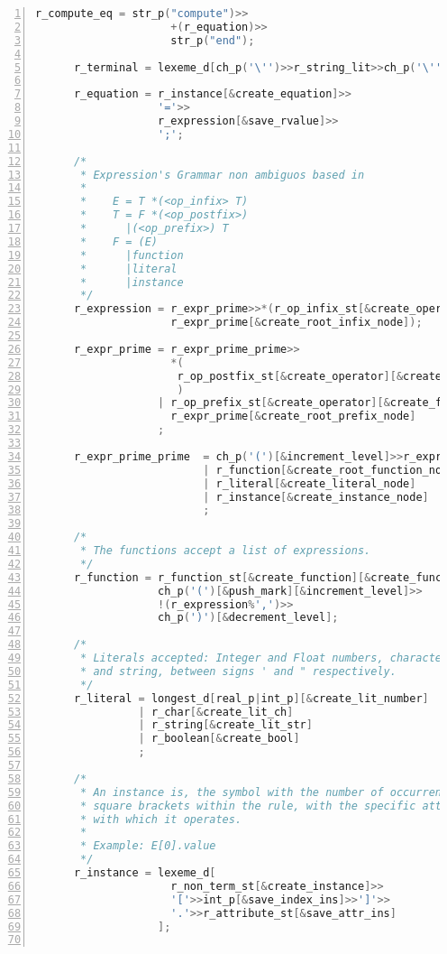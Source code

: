 \begin{center}
\begin{lstlisting}[numbers=left,basicstyle=\tiny,language=C++]
      r_compute_eq = str_p("compute")>>
                     +(r_equation)>>
                     str_p("end");

      r_terminal = lexeme_d[ch_p('\'')>>r_string_lit>>ch_p('\'')];

      r_equation = r_instance[&create_equation]>>
                   '='>>
                   r_expression[&save_rvalue]>>
                   ';';

      /*
       * Expression's Grammar non ambiguos based in
       *
       *    E = T *(<op_infix> T)
       *    T = F *(<op_postfix>)
       *      |(<op_prefix>) T
       *    F = (E)
       *      |function
       *      |literal
       *      |instance
       */
      r_expression = r_expr_prime>>*(r_op_infix_st[&create_operator][&create_func_node]>>
                     r_expr_prime[&create_root_infix_node]);

      r_expr_prime = r_expr_prime_prime>>
                     *(
                      r_op_postfix_st[&create_operator][&create_func_node][&create_root_postfix_node]
                      )
                   | r_op_prefix_st[&create_operator][&create_func_node]>>
                     r_expr_prime[&create_root_prefix_node]
                   ;

      r_expr_prime_prime  = ch_p('(')[&increment_level]>>r_expression>>ch_p(')')[&decrement_level]
                          | r_function[&create_root_function_node]
                          | r_literal[&create_literal_node]
                          | r_instance[&create_instance_node]
                          ;

      /*
       * The functions accept a list of expressions.
       */
      r_function = r_function_st[&create_function][&create_func_node]>>
                   ch_p('(')[&push_mark][&increment_level]>>
                   !(r_expression%',')>>
                   ch_p(')')[&decrement_level];

      /*
       * Literals accepted: Integer and Float numbers, characters
       * and string, between signs ' and " respectively.
       */
      r_literal = longest_d[real_p|int_p][&create_lit_number]
                | r_char[&create_lit_ch]
                | r_string[&create_lit_str]
                | r_boolean[&create_bool]
                ;

      /*
       * An instance is, the symbol with the number of occurrences in
       * square brackets within the rule, with the specific attribute
       * with which it operates.
       *
       * Example: E[0].value
       */
      r_instance = lexeme_d[
                     r_non_term_st[&create_instance]>>
                     '['>>int_p[&save_index_ins]>>']'>>
                     '.'>>r_attribute_st[&save_attr_ins]
                   ];


\end{lstlisting}
\end{center}
